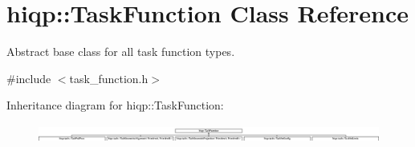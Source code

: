 \hypertarget{classhiqp_1_1TaskFunction}{\section{hiqp\-:\-:Task\-Function Class Reference}
\label{classhiqp_1_1TaskFunction}
}


Abstract base class for all task function types.  




{\ttfamily \#include $<$task\-\_\-function.\-h$>$}

Inheritance diagram for hiqp\-:\-:Task\-Function\-:\begin{figure}[H]
\begin{center}
\leavevmode
\includegraphics[height=0.607046cm]{classhiqp_1_1TaskFunction}
\end{center}
\end{figure}
